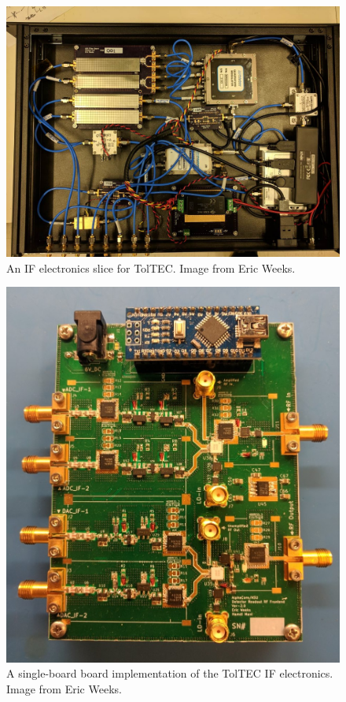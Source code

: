\begin{figure}[!htbp]
\centering
\includegraphics[width=\textwidth]{figures/conclusion/toltec_slice_2}
\caption[An IF electronics slice for TolTEC.]{An IF electronics slice for TolTEC\@. Image from Eric Weeks.}
\label{fig:toltec_slice}
\end{figure}

\begin{figure}[!htbp]
\centering
\includegraphics[width=\textwidth]{figures/conclusion/single_board}
\caption[A single-board board implementation of the TolTEC IF electronics.]{A single-board board implementation of the TolTEC IF electronics. Image from Eric Weeks.}
\label{fig:single board}
\end{figure}

